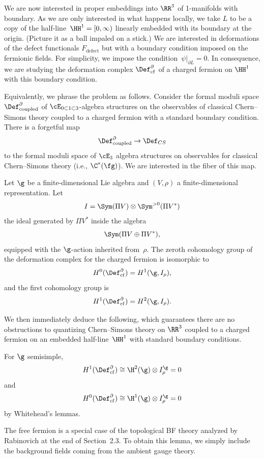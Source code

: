 \documentclass[10pt]{amsart}
\begin{document}
We are now interested in proper embeddings into $\RR^3$ of 1-manifolds with boundary.
As we are only interested in what happens locally, we take $L$ to be a copy of the half-line~$\HH^1 = [0,\infty)$ linearly embedded with its boundary at the origin.
(Picture it as a ball impaled on a stick.)
We are interested in deformations of the defect functionals $F_{\text{defect}}$ but with a boundary condition imposed on the fermionic fields.
For simplicity, we impose the condition~$\psi|_{\partial L} = 0$.
In consequence, we are studying the deformation complex $\Def^\partial_{{\rm cf}}$ of a charged fermion on $\HH^1$ with this boundary condition.

Equivalently, we phrase the problem as follows.
Consider the formal moduli space $\Def_{\rm coupled}^\partial$ of $\cE_{0 \subset 1 \subset 3}$-algebra structures on the observables of classical Chern--Simons theory coupled to a charged fermion with a standard boundary condition.
There is a forgetful map
\[
\Def_{\rm coupled}^\partial \to \Def_{CS}
\]
to the formal moduli space of $\cE_3$ algebra structures on observables for classical Chern--Simons theory (i.e., $\C^*(\fg)$).
We are interested in the fiber of this map.

\begin{lmm}
\label{lmm: bdry def cplx}
Let $\g$ be a finite-dimensional Lie algebra and $(V,\rho)$ a finite-dimensional representation.
Let
\[
I = \Sym(\Pi V) \otimes \Sym^{>0}(\Pi V^*)
\]
the ideal generated by $\Pi V^*$ inside the algebra
\[
\Sym(\Pi V \oplus \Pi V^*),
\]
equipped with the $\g$-action inherited from~$\rho$.
The zeroth cohomology group of the deformation complex for the charged fermion is isomorphic to
\[
H^0(\Def^\partial_{{\rm cf}}) = H^1(\g,I_\rho),
\]
and the first cohomology group is
\[
H^1(\Def^\partial_{{\rm cf}}) = H^2(\g,I_\rho).
\]
\end{lmm}

We then immediately deduce the following,
which guarantees there are no obstructions to quantizing Chern--Simons theory on $\RR^3$ coupled to a charged fermion on an embedded half-line~$\HH^1$ with standard boundary conditions.

\begin{crl}
For $\g$ semisimple,
\[
H^1(\Def^\partial_{{\rm cf}}) 
\cong \H^2(\g) \otimes I_\rho^\g = 0
\]
and
\[
H^0(\Def^\partial_{\rm cf}) 
\cong \H^1(\g) \otimes I_\rho^\g = 0
\]
by Whitehead's lemmas.
\end{crl}

The free fermion is a special case of the topological BF theory analyzed by Rabinovich at the end of Section~2.3.
To obtain this lemma, we simply include the background fields coming from the ambient gauge theory.
\end{document}

